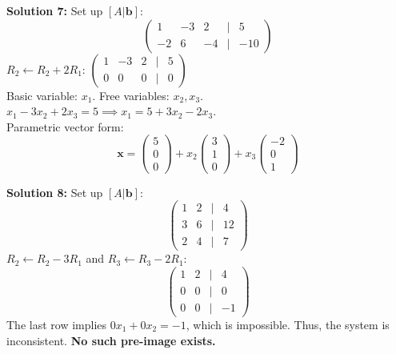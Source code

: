 \documentclass{article}
\begin{document}
\textbf{Solution 7:}
Set up $[A | \mathbf{b}]$:
$$\begin{pmatrix} 1 & -3 & 2 & | & 5 \\ -2 & 6 & -4 & | & -10 \end{pmatrix}$$
$R_2 \leftarrow R_2 + 2R_1$: $\begin{pmatrix} 1 & -3 & 2 & | & 5 \\ 0 & 0 & 0 & | & 0 \end{pmatrix}$ \\
Basic variable: $x_1$. Free variables: $x_2, x_3$. \\
$x_1 - 3x_2 + 2x_3 = 5 \implies x_1 = 5 + 3x_2 - 2x_3$. \\
Parametric vector form: 
$$\mathbf{x} = \begin{pmatrix} 5 \\ 0 \\ 0 \end{pmatrix} + x_2 \begin{pmatrix} 3 \\ 1 \\ 0 \end{pmatrix} + x_3 \begin{pmatrix} -2 \\ 0 \\ 1 \end{pmatrix}$$

\textbf{Solution 8:}
Set up $[A | \mathbf{b}]$:
$$\begin{pmatrix} 1 & 2 & | & 4 \\ 3 & 6 & | & 12 \\ 2 & 4 & | & 7 \end{pmatrix}$$
$R_2 \leftarrow R_2 - 3R_1$ and $R_3 \leftarrow R_3 - 2R_1$:
$$\begin{pmatrix} 1 & 2 & | & 4 \\ 0 & 0 & | & 0 \\ 0 & 0 & | & -1 \end{pmatrix}$$
The last row implies $0x_1 + 0x_2 = -1$, which is impossible. Thus, the system is inconsistent. \textbf{No such pre-image exists.}
\end{document}
